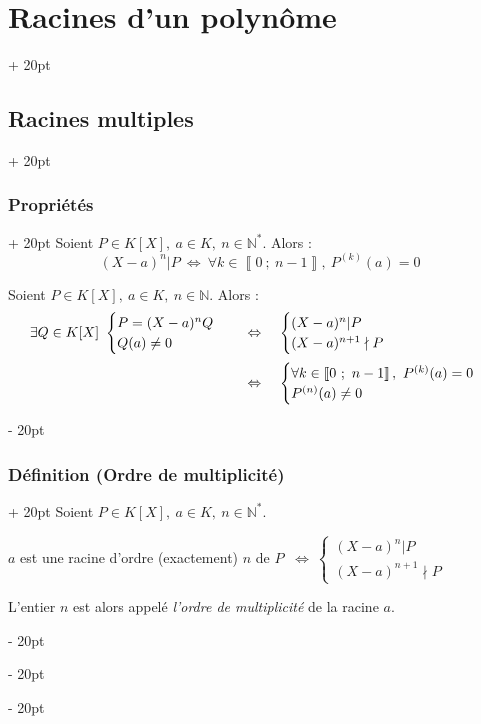 \documentclass[a4paper, 12pt, twoside]{article}
\newcommand{\N}{\mathbb{N}} %
\newcommand{\nset}[2]{\left\llbracket #1\ ;\ #2 \right\rrbracket}
\newcommand{\ssi}{\ \Leftrightarrow \ }
\newcommand{\eqsys}[2]{\begin{cases} #1 \\ #2 \end{cases}}
\newcommand{\ind}[1][20pt]{\advance\leftskip + #1}
\newcommand{\deind}[1][20pt]{\advance\leftskip - #1}
\newenvironment{indt}[2][20pt]{#2 \par \ind[#1]}{\par \deind} %
\begin{document}
\begin{indt}{\section{Racines d'un polynôme}}
        \vspace{12pt}
        
        \begin{indt}{\subsection{Racines multiples}}
            \begin{indt}{\subsubsection{Propriétés}}
                Soient $P \in K[X],\ a \in K,\ n \in \N^*$. Alors :
                    \[ (X - a)^n | P \ssi \forall k \in \nset{0}{n - 1},\ P^{(k)}(a) = 0 \]
                
                \vspace{6pt}
                
                Soient $P \in K[X],\ a \in K,\ n \in \N$. Alors :
                    \[\begin{array}{rcl}
                        \exists Q \in K[X]\ \eqsys{P = (X - a)^n Q}{Q(a) \neq 0}
                        &\ssi&
                        \eqsys{(X - a)^n | P}{(X - a)^{n + 1} \nmid P}
                        \vspace{6pt}
                        \\
                        &\ssi&
                        \eqsys{\forall k \in \nset{0}{n - 1},\ P^{(k)}(a) = 0}{P^{(n)}(a) \neq 0}
                    \end{array}\]
            \end{indt}
            
            \vspace{6pt}
            
            \begin{indt}{\subsubsection{Définition (Ordre de multiplicité)}}
                Soient $P \in K[X],\ a \in K,\ n \in \N^*$.
                
                $a$ est une racine d'ordre (exactement) $n$ de $P$ $\ssi \eqsys{(X - a)^n | P}{(X - a)^{n + 1} \nmid P}$
                
                L'entier $n$ est alors appelé \textit{l'ordre de multiplicité} de la racine $a$.
                
                \vspace{12pt}
                

\end{indt}
\end{indt}
\end{indt}
\end{document}
